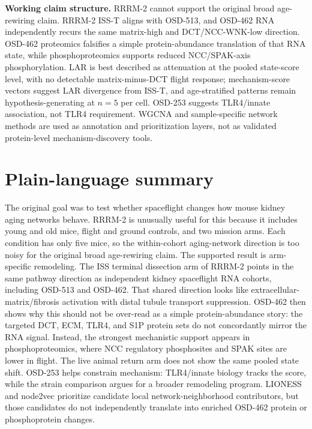 \documentclass[11pt]{article}
\begin{document}
\vspace{0.8em}
\noindent\textbf{Working claim structure.}
RRRM-2 cannot support the original broad age-rewiring claim. RRRM-2 ISS-T aligns with OSD-513, and OSD-462 RNA independently recurs the same matrix-high and DCT/NCC-WNK-low direction. OSD-462 proteomics falsifies a simple protein-abundance translation of that RNA state, while phosphoproteomics supports reduced NCC/SPAK-axis phosphorylation. LAR is best described as attenuation at the pooled state-score level, with no detectable matrix-minus-DCT flight response; mechanism-score vectors suggest LAR divergence from ISS-T, and age-stratified patterns remain hypothesis-generating at $n=5$ per cell. OSD-253 suggests TLR4/innate association, not TLR4 requirement. WGCNA and sample-specific network methods are used as annotation and prioritization layers, not as validated protein-level mechanism-discovery tools.

\clearpage

\section*{Plain-language summary}

\noindent
The original goal was to test whether spaceflight changes how mouse kidney aging networks behave. RRRM-2 is unusually useful for this because it includes young and old mice, flight and ground controls, and two mission arms. Each condition has only five mice, so the within-cohort aging-network direction is too noisy for the original broad age-rewiring claim. The supported result is arm-specific remodeling. The ISS terminal dissection arm of RRRM-2 points in the same pathway direction as independent kidney spaceflight RNA cohorts, including OSD-513 and OSD-462. That shared direction looks like extracellular-matrix/fibrosis activation with distal tubule transport suppression. OSD-462 then shows why this should not be over-read as a simple protein-abundance story: the targeted DCT, ECM, TLR4, and S1P protein sets do not concordantly mirror the RNA signal. Instead, the strongest mechanistic support appears in phosphoproteomics, where NCC regulatory phosphosites and SPAK sites are lower in flight. The live animal return arm does not show the same pooled state shift. OSD-253 helps constrain mechanism: TLR4/innate biology tracks the score, while the strain comparison argues for a broader remodeling program. LIONESS and node2vec prioritize candidate local network-neighborhood contributors, but those candidates do not independently translate into enriched OSD-462 protein or phosphoprotein changes.
\end{document}
